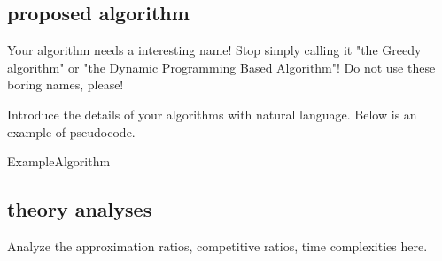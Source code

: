 \subsection{proposed algorithm}

Your algorithm needs a interesting name! Stop simply calling it "the Greedy algorithm" or "the Dynamic Programming Based Algorithm"! Do not use these boring names, please!

Introduce the details of your algorithms with natural language. Below is an example of  pseudocode.


\begin{algorithm}[t]
	\DontPrintSemicolon
	
	
	
		
	

	
	\;
	\caption{ExampleAlgorithm}
	\label{algo:example_algorithm}
\end{algorithm}

\subsection{theory analyses}

Analyze the approximation ratios, competitive ratios, time complexities here.

